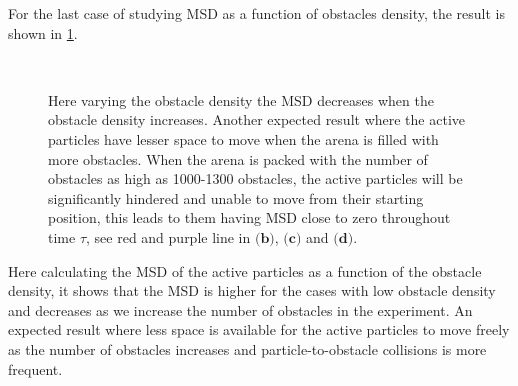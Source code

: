 For the last case of studying MSD as a function of obstacles density, the result is shown in 
\cref{fig:msd_NC}.



\begin{figure}[htbp]
\centering
\\
\caption{Here varying the obstacle density the MSD decreases when the obstacle density increases. 
Another expected result where the active particles have lesser space to move when the arena is 
filled with more obstacles. When the arena is packed with the number of obstacles as high as 
1000-1300 obstacles, the active particles will be significantly hindered and unable to move 
from their starting position, this leads to them having MSD close to zero throughout time $\tau$, 
see red and purple line in $\textbf{(b)}$, $\textbf{(c)}$ and $\textbf{(d)}$.} 
\label{fig:msd_NC}
\end{figure}

Here calculating the MSD of the active particles as a function of 
the obstacle density, it shows that the MSD is higher for the cases with low obstacle density and 
decreases as we increase the number of obstacles in the experiment. An expected result 
where less space is available for the active particles to move freely as the number 
of obstacles increases and particle-to-obstacle collisions is more frequent.


